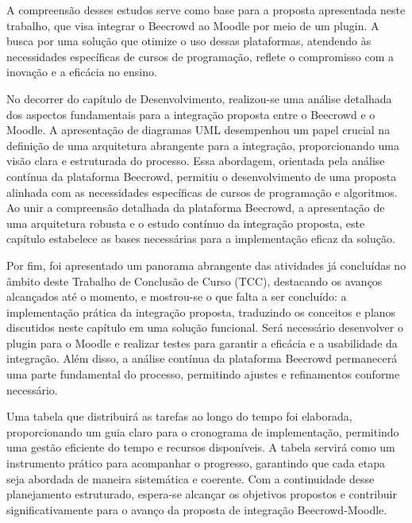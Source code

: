 A compreensão desses estudos serve como base para a proposta apresentada neste trabalho, que visa integrar o Beecrowd ao Moodle por meio de um plugin. A busca por uma solução que otimize o uso dessas plataformas, atendendo às necessidades específicas de cursos de programação, reflete o compromisso com a inovação e a eficácia no ensino.

No decorrer do capítulo de Desenvolvimento, realizou-se uma análise detalhada dos aspectos fundamentais para a integração proposta entre o Beecrowd e o Moodle. A apresentação de diagramas UML desempenhou um papel crucial na definição de uma arquitetura abrangente para a integração, proporcionando uma visão clara e estruturada do processo. Essa abordagem, orientada pela análise contínua da plataforma Beecrowd, permitiu o desenvolvimento de uma proposta alinhada com as necessidades específicas de cursos de programação e algoritmos. Ao unir a compreensão detalhada da plataforma Beecrowd, a apresentação de uma arquitetura robusta e o estudo contínuo da integração proposta, este capítulo estabelece as bases necessárias para a implementação eficaz da solução.

Por fim, foi apresentado um panorama abrangente das atividades já concluídas no âmbito deste Trabalho de Conclusão de Curso (TCC), destacando os avanços alcançados até o momento, e mostrou-se o que falta a ser concluído: a implementação prática da integração proposta, traduzindo os conceitos e planos discutidos neste capítulo em uma solução funcional. Será necessário desenvolver o plugin para o Moodle e realizar testes para garantir a eficácia e a usabilidade da integração. Além disso, a análise contínua da plataforma Beecrowd permanecerá uma parte fundamental do processo, permitindo ajustes e refinamentos conforme necessário.

Uma tabela que distribuirá as tarefas ao longo do tempo foi elaborada, proporcionando um guia claro para o cronograma de implementação, permitindo uma gestão eficiente do tempo e recursos disponíveis. A tabela servirá como um instrumento prático para acompanhar o progresso, garantindo que cada etapa seja abordada de maneira sistemática e coerente. Com a continuidade desse planejamento estruturado, espera-se alcançar os objetivos propostos e contribuir significativamente para o avanço da proposta de integração Beecrowd-Moodle.



